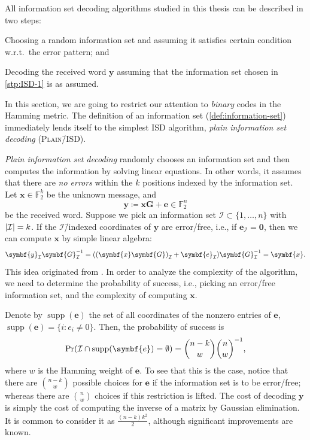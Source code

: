 \documentclass[version=last, paper=A4, parskip=half, oneside,%
toc=bibliography, toc=listof, listof=leveldown]{scrbook}
\theoremstyle{plain}
\theoremstyle{definition}
\theoremstyle{remark}
\renewcommand*{\vec}{\symbf}
\newcommand*{\mat}{\symbf}
\DeclareMathOperator{\supp}{supp}
\newcommand*{\FF}{\ensuremath{\mathbb{F}}}
\DeclarePairedDelimiter{\card}{\lvert}{\rvert}
\newcommand*{\PISD}{\textsc{Plain}\=/ISD}
\begin{document}
All information set decoding algorithms studied in this thesis can be described
in two steps:
\begin{steps}
\item\label{stp:ISD-1} Choosing a random information set and assuming it
  satisfies certain condition w.r.t.\ the error pattern; and
\item\label{stp:ISD-2} Decoding the received word \(\vec{y}\) assuming that the
  information set chosen in \cref{stp:ISD-1} is as assumed.
\end{steps}

In this section, we are going to restrict our attention to \emph{binary} codes
in the Hamming metric.  The definition of an information set
(\cref{def:information-set}) immediately lends itself to the simplest ISD
algorithm, \emph{plain information set decoding} (\PISD).

\emph{Plain information set decoding} randomly chooses an information set and
then computes the information by solving linear equations.  In other words, it
assumes that there are \emph{no errors} within the \(k\) positions indexed by
the information set.  Let \(\vec{x} \in \FF_2^k\) be the unknown message, and
\[
  \vec{y} \coloneqq \vec{x} \mat{G} + \vec{e} \in \FF_2^n
\]
be the received word.  Suppose we pick an information set
\(\mathcal{I} \subset \{1, \ldots, n\}\) with \(\card{\mathcal{I}} = k\).  If
the \(\mathcal{I}\)\=/indexed coordinates of \(\vec{y}\) are error\-/free,
i.e., if \(\vec{e}_{\mathcal{I}} = \vec{0}\), then we can compute \(\vec{x}\)
by simple linear algebra:
\[
  \vec{y}_{\mathcal{I}} \mat{G}_{\mathcal{I}}^{-1} =
  ({(\vec{x} \mat{G})}_{\mathcal{I}} + \vec{e}_{\mathcal{I}}) \mat{G}_{\mathcal{I}}^{-1} =
  \vec{x}\text.
\]
This idea originated from \textcite{Pra62}.  In order to analyze the complexity
of the algorithm, we need to determine the probability of success, i.e., picking
an error\-/free information set, and the complexity of computing \(\vec{x}\).


Denote by \(\supp(\vec{e})\) the set of all coordinates of the nonzero entries
of \(\vec{e}\), \(\supp(\vec{e}) = \{i : e_i \ne 0\}\).  Then, the probability
of success is
\[
  \Pr(\mathcal{I} \cap \supp(\vec{e}) = \emptyset) = \binom{n - k}{w}\binom{n}{w}^{-1}\text,
\]
where \(w\) is the Hamming weight of \(\vec{e}\).  To see that this is the case,
notice that there are \(\binom{n - k}{w}\) possible choices for \(\vec{e}\) if
the information set is to be error\-/free; whereas there are \(\binom{n}{w}\)
choices if this restriction is lifted.  The cost of decoding \(\vec{y}\) is
simply the cost of computing the inverse of a matrix by Gaussian elimination.
It is common to consider it as \(\frac{(n - k) k^2}{2}\), although significant
improvements are known.
\end{document}
